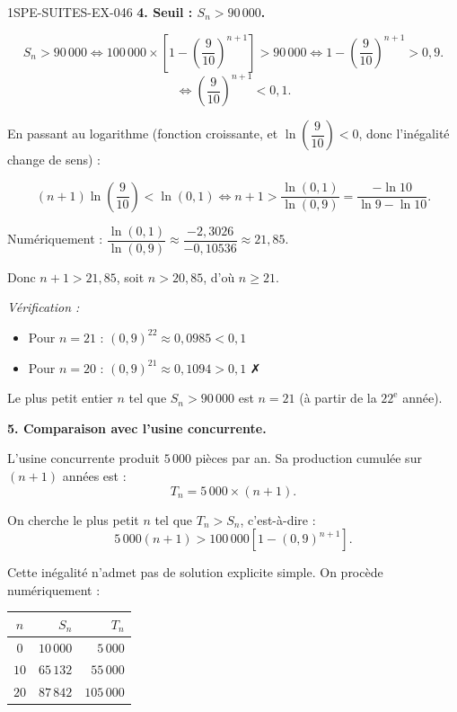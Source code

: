 \begin{corrige}{1SPE-SUITES-EX-046}
\textbf{4. Seuil : $S_n > 90\,000$.}


\[
S_n > 90\,000 \iff 100\,000 \times \left[1 - \left(\frac{9}{10}\right)^{n+1}\right] > 90\,000 \iff 1 - \left(\frac{9}{10}\right)^{n+1} > 0{,}9.
\]
\[
\iff \left(\frac{9}{10}\right)^{n+1} < 0{,}1.
\]

En passant au logarithme (fonction croissante, et $\ln\!\left(\dfrac{9}{10}\right) < 0$, donc l'inégalité change de sens) :

\[
(n+1)\ln\!\left(\frac{9}{10}\right) < \ln(0{,}1) \iff n+1 > \frac{\ln(0{,}1)}{\ln(0{,}9)} = \frac{-\ln 10}{\ln 9 - \ln 10}.
\]

Numériquement : $\dfrac{\ln(0{,}1)}{\ln(0{,}9)} \approx \dfrac{-2{,}3026}{-0{,}10536} \approx 21{,}85$.

Donc $n + 1 > 21{,}85$, soit $n > 20{,}85$, d'où $n \geq 21$.

\textit{Vérification :}
\begin{itemize}
  \item Pour $n = 21$ : $(0{,}9)^{22} \approx 0{,}0985 < 0{,}1$ \checkmark
  \item Pour $n = 20$ : $(0{,}9)^{21} \approx 0{,}1094 > 0{,}1$ ✗
\end{itemize}

Le plus petit entier $n$ tel que $S_n > 90\,000$ est $\boxed{n = 21}$ (à partir de la $22^\text{e}$ année).

\textbf{5. Comparaison avec l'usine concurrente.}


L'usine concurrente produit $5\,000$ pièces par an. Sa production cumulée sur $(n+1)$ années est :
\[
T_n = 5\,000 \times (n + 1).
\]

On cherche le plus petit $n$ tel que $T_n > S_n$, c'est-à-dire :
\[
5\,000(n+1) > 100\,000\left[1 - (0{,}9)^{n+1}\right].
\]

Cette inégalité n'admet pas de solution explicite simple. On procède numériquement :

\begin{center}
\begin{tabular}{|c|r|r|}
\hline
$n$ & $S_n$ & $T_n$ \\
\hline
$0$ & $10\,000$ & $5\,000$ \\
$10$ & $65\,132$ & $55\,000$ \\
$20$ & $87\,842$ & $105\,000$ \\
\hline
\end{tabular}
\end{center}


\end{corrige}
